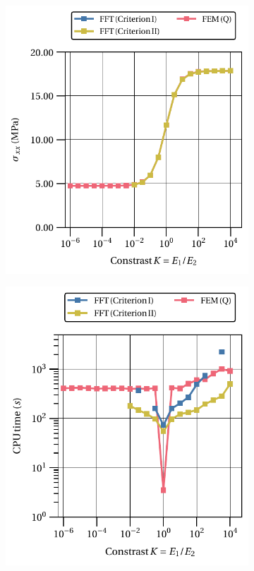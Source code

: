 \begin{figure}[hbt]
  \centering
	\begin{subfigure}[b]{0.49\textwidth}
    \centering
    \includegraphics[width=\textwidth]{figures/hencky_2D_normal_stress_avg_vs_stiff_ratio}
    \caption{}
    \label{subfig:hencky_2D_normal_stress_avg_vs_stiff_ratio}
  \end{subfigure}
  \begin{subfigure}[b]{0.49\textwidth}
    \centering
    \includegraphics[width=\textwidth]{figures/hencky_2D_normal_stress_avg_cpu_time_vs_n_voxels}

\end{subfigure}
\end{figure}
